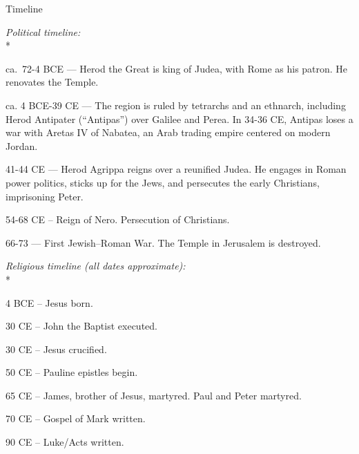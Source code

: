 \documentclass[10pt,a5paper,twoside]{article}
\newcommand{\doimage}[2]{\texttt{[image: \#2]}\label{fig:#2}}
\newcommand{\figbasic}[4]{ %
    \ifthenelse{\isodd{\pageref{fig:#2}}}{}{\hfill}
    \ifstrempty{#3}{
      \doimage{#1}{#2}
    }{
      \makebox{\doimage{#1}{#2} \\ #3}
    }
    \ifthenelse{\isodd{\pageref{fig:#2}}}{\hfill}{}
    \par
}
\newcommand{\fig}[2][0.4]{
  \figbasic{#1}{#2}{}{}
}
\newcommand{\subhead}[1]{\emph{#1}\\*}
\begin{document}
\begin{section}{Timeline}

\subhead{Political timeline:}

ca.~72-4 BCE --- Herod the Great is king of Judea, with Rome as his patron. He renovates the Temple.

ca. 4 BCE-39 CE --- The region is ruled by tetrarchs and an ethnarch, including Herod Antipater (``Antipas'') over Galilee and Perea.
      In 34-36 CE, Antipas loses a war with Aretas IV of Nabatea, an Arab trading empire centered on modern Jordan.

41-44 CE --- Herod Agrippa reigns over a reunified Judea. He engages in Roman power politics, sticks up for the Jews,
      and persecutes the early Christians, imprisoning Peter.

54-68 CE -- Reign of Nero. Persecution of Christians.

66-73 --- First Jewish–Roman War. The Temple in Jerusalem is destroyed.

\subhead{Religious timeline (all dates approximate):}

4 BCE -- Jesus born.

30 CE -- John the Baptist executed.

30 CE -- Jesus crucified.

50 CE -- Pauline epistles begin.

65 CE -- James, brother of Jesus, martyred. Paul and Peter martyred.

70 CE -- Gospel of Mark written.

90 CE -- Luke/Acts written.

\end{section}

\vfill

\pagebreak

\fig{john-in-the-wilderness}
\end{document}
